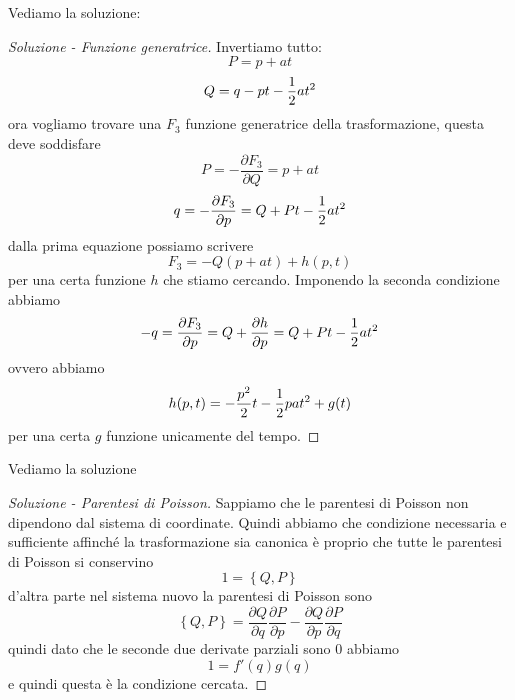 \documentclass[11pt]{scrartcl}
\begin{document}
	\begin{sol}
		Vediamo la soluzione:
		\begin{proof}[Soluzione - Funzione generatrice]
			Invertiamo tutto:
			$$P=p+at$$
			$$Q=q-pt-\frac{1}{2} a t^2$$
			ora vogliamo trovare una $F_3$ funzione generatrice della trasformazione, questa deve soddisfare
			$$P=-\frac{\partial F_3}{\partial Q}=p+at$$
			$$q=-\frac{\partial F_3}{\partial p}=Q+Pt-\frac{1}{2} a t^2$$
			dalla prima equazione possiamo scrivere
			$$F_3=-Q(p+at)+h(p,t)$$
			per una certa funzione $h$ che stiamo cercando. Imponendo la seconda condizione abbiamo
			$$-q=\frac{\partial F_3}{\partial p}=Q+\frac{\partial h}{\partial p}=Q+Pt-\frac{1}{2} a t^2$$
			ovvero abbiamo
			$$h(p,t)=-\frac{p^2}{2}t-\frac{1}{2} pat^2+g(t)$$
			per una certa $g$ funzione unicamente del tempo.
		\end{proof}
	\end{sol}
	\begin{sol}
		Vediamo la soluzione
		\begin{proof}[Soluzione - Parentesi di Poisson]
			Sappiamo che le parentesi di Poisson non dipendono dal sistema di coordinate. Quindi abbiamo che condizione necessaria e sufficiente affinché la trasformazione sia canonica è proprio che tutte le parentesi di Poisson si conservino
			$$1=\left\{Q,P\right\}$$
			d'altra parte nel sistema nuovo la parentesi di Poisson sono
			$$\left\{Q,P\right\}=\frac{\partial Q}{\partial q}\frac{\partial P}{\partial p}-\frac{\partial Q}{\partial p}\frac{\partial P}{\partial q}$$
			quindi dato che le seconde due derivate parziali sono $0$ abbiamo
			$$1=f'(q)g(q)$$
			e quindi questa è la condizione cercata.
		\end{proof}
	\end{sol}
	
	
	
\end{document}

